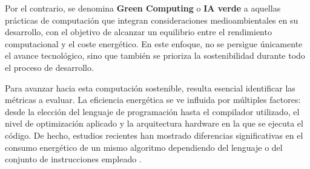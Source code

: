 Por el contrario, se denomina \textbf{Green Computing} o \textbf{IA verde} a aquellas prácticas de computación que integran consideraciones medioambientales en su desarrollo, con el objetivo de alcanzar un equilibrio entre el rendimiento computacional y el coste energético. En este enfoque, no se persigue únicamente el avance tecnológico, sino que también se prioriza la sostenibilidad durante todo el proceso de desarrollo. \cite{zhou2023opportunities}

Para avanzar hacia esta computación sostenible, resulta esencial identificar las métricas a evaluar. La eficiencia energética se ve influida por múltiples factores: desde la elección del lenguaje de programación hasta el compilador utilizado, el nivel de optimización aplicado y la arquitectura hardware en la que se ejecuta el código. De hecho, estudios recientes han mostrado diferencias significativas en el consumo energético de un mismo algoritmo dependiendo del lenguaje o del conjunto de instrucciones empleado \cite{lutz2021energy}.




